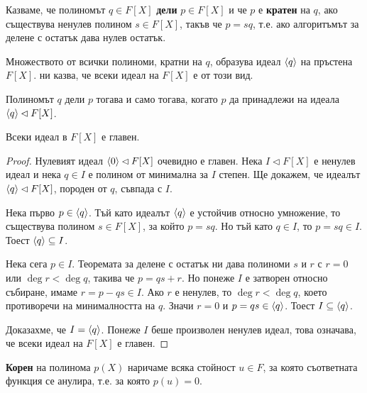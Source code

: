 \documentclass[
  headings=standardclasses,
  bibliography=totocnumbered,
]{scrartcl}
\begin{document}
\begin{definition}
  Казваме, че полиномът \( q \in F[X] \) \textbf{дели} \( p \in F[X] \) и че \( p \) е \textbf{кратен} на \( q \), ако съществува ненулев полином \( s \in F[X] \), такъв че \( p = sq \), т.е. ако алгоритъмът за делене с остатък дава нулев остатък.

  Множеството от всички полиноми, кратни на \( q \), образува идеал \( \left\langle q \right\rangle \) на пръстена \( F[X] \).  ни казва, че всеки идеал на \( F[X] \) е от този вид.

  Полиномът \( q \) дели \( p \) тогава и само тогава, когато \( p \) да принадлежи на идеала \( \left\langle q \right\rangle \lhd F[X] \).
\end{definition}

\begin{theorem}\label{thm:polynomial_ideals_are_principal}
  Всеки идеал в \( F[X] \) е главен.
\end{theorem}
\begin{proof}
  Нулевият идеал \( \left\langle 0 \right\rangle \lhd F[X] \) очевидно е главен. Нека \( I \lhd F[X] \) е ненулев идеал и нека \( q \in I \) е полином от минимална за \( I \) степен. Ще докажем, че идеалът \( \left\langle q \right\rangle \lhd F[X] \), породен от \( q \), съвпада с \( I \).

  Нека първо \( p \in \left\langle q \right\rangle \). Тъй като идеалът \( \left\langle q \right\rangle \) е устойчив относно умножение, то съществува полином \( s \in F[X] \), за който \( p = sq \). Но тъй като \( q \in I \), то \( p = sq \in I \). Тоест \( \left\langle q \right\rangle \subseteq I \).

  Нека сега \( p \in I \). Теоремата за делене с остатък ни дава полиноми \( s \) и \( r \) с \( r = 0 \) или \( \deg r < \deg q \), такива че \( p = qs + r \). Но понеже \( I \) е затворен относно събиране, имаме \( r = p - qs \in I \). Ако \( r \) е ненулев, то \( \deg r < \deg q \), което противоречи на минималността на \( q \). Значи \( r = 0 \) и \( p = qs \in \left\langle q \right\rangle \). Тоест \( I \subseteq \left\langle q \right\rangle \).

  Доказахме, че \( I = \left\langle q \right\rangle \). Понеже \( I \) беше произволен ненулев идеал, това означава, че всеки идеал на \( F[X] \) е главен.
\end{proof}

\begin{definition}
  \textbf{Корен} на полинома \( p(X) \) наричаме всяка стойност \( u \in F \), за която съответната функция се анулира, т.е. за която \( p(u) = 0 \).
\end{definition}
\end{document}

